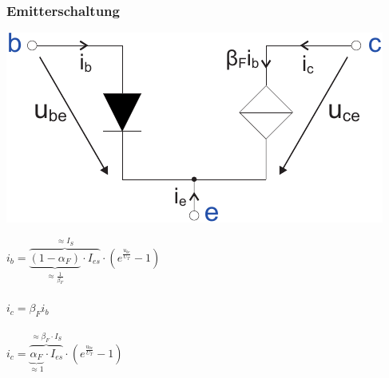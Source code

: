 \documentclass[a4paper,twocolumn,10pt]{article}
\begin{document}
\subsubsection*{Emitterschaltung}
\begin{minipage}[b]{0.23\textwidth}
\includegraphics[width=\textwidth]{img/Emitterschaltung_Vereinfachung}\\
\end{minipage}
\hfill
\begin{minipage}[b]{0.23\textwidth}
$i_b=\overbrace{\underbrace{(1-\alpha_F)}_{\approx \frac{1}{\beta_F}}\cdot I_{es}}^{\approx I_S}\cdot (e^{\frac{u_{be}}{U_T}}-1)$\\\\
$i_c=\beta_Fi_b$\\\\
$i_c=\overbrace{\underbrace{\alpha_F}_{\approx 1}\cdot I_{es}}^{\approx \beta_F\cdot I_S}\cdot (e^{\frac{u_{be}}{U_T}}-1)$\\
\end{minipage}
\end{document}
